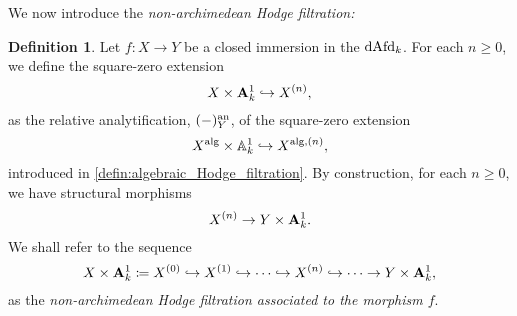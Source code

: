 \documentclass[10pt,a4paper,reqno]{amsart} %
\theoremstyle{plain}
\newtheorem{prop}[thm]{Proposition}
\theoremstyle{definition}
\newtheorem{defin}[thm]{Definition}
\theoremstyle{remark}
\numberwithin{equation}{section}
\begin{document}



We now introduce the \emph{non-archimedean Hodge filtration:}

\begin{defin}
    Let $f \colon X \to Y$ be a closed immersion in the \infcat $\mathrm{dAfd}_k$. For each $n \ge 0$, we define the square-zero extension
        \[
            X \times \mathbf A^1_k \hookrightarrow X^{(n)},  
        \]
    as the relative analytification, $(-) ^\mathrm{an}_Y$, of the square-zero extension
        \[
            X ^\mathrm{alg} \times \mathbb A^1_k \hookrightarrow X^{\mathrm{alg}, (n)},
        \]
    introduced in \cref{defin:algebraic_Hodge_filtration}.
    By construction, for each $n \ge 0$, we have structural morphisms
        \[
            X^{(n)} \to Y \times \mathbf A^1_k.  
        \]
    We shall refer to the sequence
        \[
            X \times \mathbf A^1_k \coloneqq X^{(0)} \hookrightarrow X^{(1)} \hookrightarrow \dots \hookrightarrow X^{(n)} \hookrightarrow \dots \to Y \times \mathbf A^1_k,  
        \]
    as the \emph{non-archimedean Hodge filtration associated to the morphism $f$}.
\end{defin}
\end{document}
